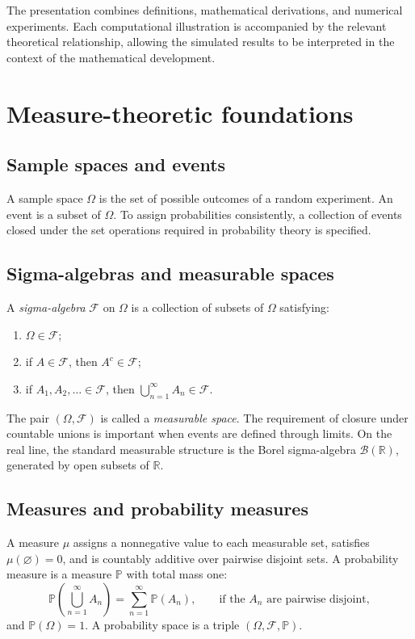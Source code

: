 \documentclass[11pt,a4paper,oneside]{article}
\newcommand{\Prob}{\mathbb{P}}
\newcommand{\R}{\mathbb{R}}
\newcommand{\Borel}{\mathcal{B}}
\newcommand{\F}{\mathcal{F}}
\newcommand{\Om}{\Omega}
\begin{document}
The presentation combines definitions, mathematical derivations, and numerical experiments. Each computational illustration is accompanied by the relevant theoretical relationship, allowing the simulated results to be interpreted in the context of the mathematical development.

\setcounter{tocdepth}{1}
\tableofcontents
\clearpage
\hypersetup{pageanchor=true}

\section{Measure-theoretic foundations}
\subsection{Sample spaces and events}
A sample space $\Om$ is the set of possible outcomes of a random experiment. An event is a subset of $\Om$. To assign probabilities consistently, a collection of events closed under the set operations required in probability theory is specified.

\subsection{Sigma-algebras and measurable spaces}
A \emph{sigma-algebra} $\F$ on $\Om$ is a collection of subsets of $\Om$ satisfying:
\begin{enumerate}
  \item $\Om\in\F$;
  \item if $A\in\F$, then $A^c\in\F$;
  \item if $A_1,A_2,\ldots\in\F$, then $\displaystyle\bigcup_{n=1}^{\infty}A_n\in\F$.
\end{enumerate}
The pair $(\Om,\F)$ is called a \emph{measurable space}. The requirement of closure under countable unions is important when events are defined through limits. On the real line, the standard measurable structure is the Borel sigma-algebra $\Borel(\R)$, generated by open subsets of $\R$.

\subsection{Measures and probability measures}
A measure $\mu$ assigns a nonnegative value to each measurable set, satisfies $\mu(\varnothing)=0$, and is countably additive over pairwise disjoint sets. A probability measure is a measure $\Prob$ with total mass one:
\begin{equation}\label{eq:countadd}
 \Prob\!\left(\bigcup_{n=1}^{\infty}A_n\right)
 =\sum_{n=1}^{\infty}\Prob(A_n),
 \qquad \text{if the }A_n\text{ are pairwise disjoint},
\end{equation}
and $\Prob(\Om)=1$. A probability space is a triple $(\Om,\F,\Prob)$.
\end{document}
